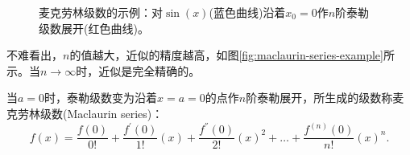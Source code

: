 \begin{subappendices}
\begin{lemma}[泰勒——麦克劳林级数]
\begin{figure}[htbp]
{\begin{minipage}{7cm}
  \end{minipage}}
  \caption{麦克劳林级数的示例：对$\sin(x)$(蓝色曲线)沿着$x_{0}=0$作$n$阶泰勒级数展开(红色曲线)。} %
  \label{fig:maclaurin-series-example} %
\end{figure}

不难看出，$n$的值越大，近似的精度越高，如图\eqref{fig:maclaurin-series-example}所示。当$n \rightarrow \infty$时，近似是完全精确的。

当$a=0$时，泰勒级数变为沿着$x=a=0$的点作$n$阶泰勒展开，所生成的级数称麦克劳林级数(Maclaurin series)：
\begin{equation}
  \label{eq:taylor-maclaurin-series-def}
  f \left( x \right) = \frac{f(0)}{0!}
  + \frac{f^{'}(0)}{1!} \left( x  \right)
  + \frac{f^{''}(0)}{2!} \left( x \right)^{2}
  + \ldots
  + \frac{f^{(n)}(0)}{n!} \left( x \right)^{n}.
\end{equation}
\end{lemma}


\end{subappendices}
